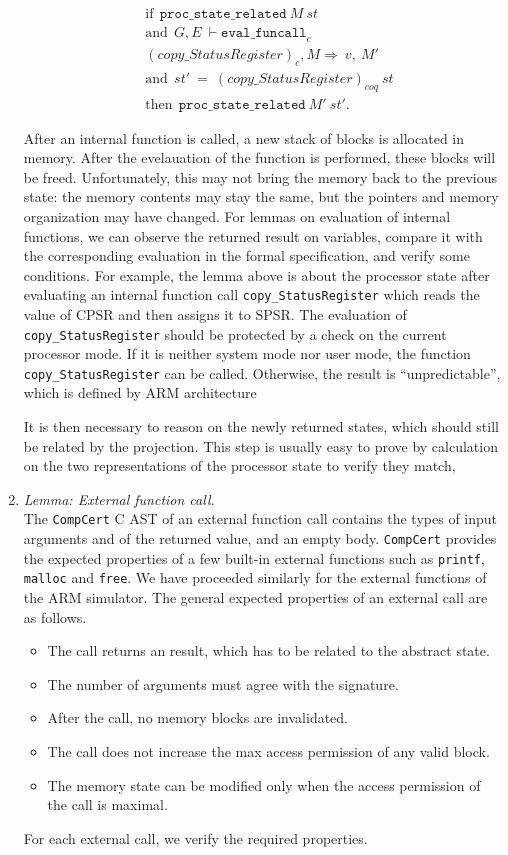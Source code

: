 \documentclass[twocolumn]{article}
\newcommand{\compcert}{\texttt{CompCert}\xspace}
\begin{document}
\begin{enumerate}
\begin{align*}
&\textrm{if} ~~  \texttt{proc\_state\_related}~M~st \\
&\textrm{and} ~~ G,E~\vdash \texttt{eval\_funcall}_c\\
&        (copy\_StatusRegister)_c,M\Rightarrow~v,~M'\\
&\textrm{and} ~~ st'~=~(copy\_StatusRegister)_{coq}~st\\
&\textrm{then} ~~\texttt{proc\_state\_related}~M'~st'.
\end{align*}

After an internal function is called, a new stack of blocks is
allocated in memory.  After the evelauation of the function is
performed, these blocks will be freed.  Unfortunately, this may not
bring the memory back to the previous state: the memory contents may
stay the same, but the pointers and memory organization may have
changed. For lemmas on evaluation of internal functions, we can
observe the returned result on variables, compare it with the
corresponding evaluation in the formal specification, and verify some
conditions.  For example, the lemma above is about the processor state
after evaluating an internal function call
\texttt{copy\_StatusRegister} which reads the value of CPSR and then
assigns it to SPSR.  The evaluation of \texttt{copy\_StatusRegister}
should be protected by a check on the current processor mode.  If it
is neither system mode nor user mode, the function
\texttt{copy\_StatusRegister} can be called.  Otherwise, the result is
``unpredictable'', which is defined by ARM architecture

It is then necessary to reason on the newly returned states,
which should still be related by the projection.
This step is usually easy to prove by calculation on the
two representations of the processor state to verify they match,
\item
  \textit{Lemma: External function call.}\\
  The \compcert C AST of an external function call contains the types
  of input arguments and of the returned value, and an empty body.
  \compcert provides the expected properties of a few built-in
  external functions such as \texttt{printf}, \texttt{malloc} and
  \texttt{free}.  We have proceeded similarly for the external
  functions of the ARM simulator.  The general expected properties of
  an external call are as follows.
\begin{itemize}
\item The call returns an result, which has to be related to the
  abstract state.
\item
  The number of arguments must agree with the signature.
\item
  After the call, no memory blocks are invalidated.
\item
  The call does not increase the max access permission of any
  valid block.
\item
  The memory state can be modified only when the
  access permission of the call is maximal.
\end{itemize}
For each external call, we verify the required properties.
\end{enumerate}
\end{document}
